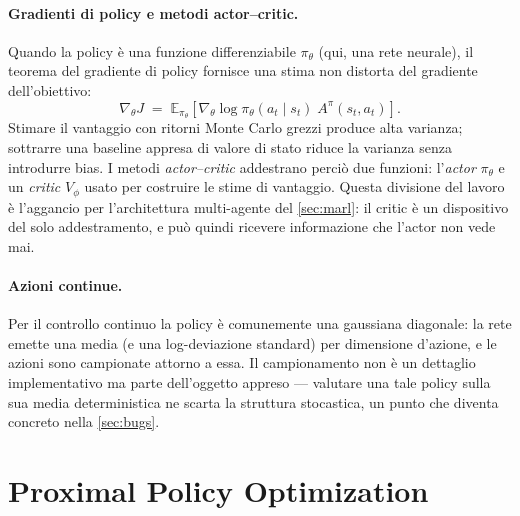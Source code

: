 \paragraph{Gradienti di policy e metodi actor--critic.}
Quando la policy è una funzione differenziabile $\pi_{\theta}$ (qui, una
rete neurale), il teorema del gradiente di policy fornisce una stima non
distorta del gradiente dell'obiettivo:
\begin{equation}
  \nabla_{\theta} J \;=\;
  \mathbb{E}_{\pi_{\theta}}\!\left[\nabla_{\theta}
  \log \pi_{\theta}(a_t \mid s_t)\; A^{\pi}(s_t, a_t)\right].
\end{equation}
Stimare il vantaggio con ritorni Monte Carlo grezzi produce alta
varianza; sottrarre una baseline appresa di valore di stato riduce la
varianza senza introdurre bias. I metodi \emph{actor--critic} addestrano
perciò due funzioni: l'\emph{actor} $\pi_{\theta}$ e un \emph{critic}
$V_{\phi}$ usato per costruire le stime di vantaggio. Questa divisione
del lavoro è l'aggancio per l'architettura multi-agente del
\cref{sec:marl}: il critic è un dispositivo del solo addestramento, e
può quindi ricevere informazione che l'actor non vede mai.

\paragraph{Azioni continue.}
Per il controllo continuo la policy è comunemente una gaussiana
diagonale: la rete emette una media (e una log-deviazione standard) per
dimensione d'azione, e le azioni sono campionate attorno a essa. Il
campionamento non è un dettaglio implementativo ma parte dell'oggetto
appreso --- valutare una tale policy sulla sua media deterministica ne
scarta la struttura stocastica, un punto che diventa concreto nella
\cref{sec:bugs}.

\section{Proximal Policy Optimization}
\label{sec:ppo}


